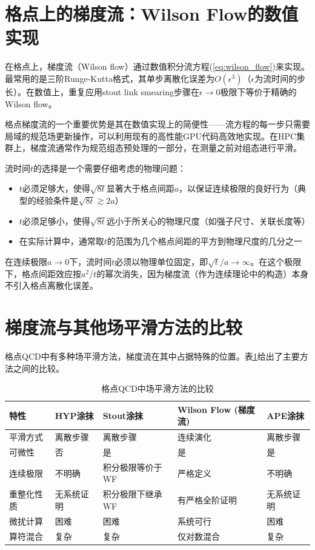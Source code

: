 \documentclass[12pt,a4paper]{ctexart}
\theoremstyle{definition}
\begin{document}
\section{格点上的梯度流：Wilson Flow的数值实现}

在格点上，梯度流（Wilson flow）通过数值积分流方程(\ref{eq:wilson_flow})来实现。最常用的是三阶Runge-Kutta格式，其单步离散化误差为$O(\epsilon^3)$（$\epsilon$为流时间的步长）。在数值上，重复应用stout link smearing步骤在$\epsilon \to 0$极限下等价于精确的Wilson flow\cite{Luscher2010}。

格点梯度流的一个重要优势是其在数值实现上的简便性——流方程的每一步只需要局域的规范场更新操作，可以利用现有的高性能GPU代码高效地实现。在HPC集群上，梯度流通常作为规范组态预处理的一部分，在测量之前对组态进行平滑。

流时间$t$的选择是一个需要仔细考虑的物理问题：
\begin{itemize}
    \item $t$必须足够大，使得$\sqrt{8t}$显著大于格点间距$a$，以保证连续极限的良好行为（典型的经验条件是$\sqrt{8t} \gtrsim 2a$）
    \item $t$必须足够小，使得$\sqrt{8t}$远小于所关心的物理尺度（如强子尺寸、关联长度等）
    \item 在实际计算中，通常取$t$的范围为几个格点间距的平方到物理尺度的几分之一
\end{itemize}

在连续极限$a \to 0$下，流时间$t$必须以物理单位固定，即$\sqrt{t}/a \to \infty$。在这个极限下，格点间距效应按$a^2/t$的幂次消失，因为梯度流（作为连续理论中的构造）本身不引入格点离散化误差。

\section{梯度流与其他场平滑方法的比较}

格点QCD中有多种场平滑方法，梯度流在其中占据特殊的位置。表\ref{tab:comparison}给出了主要方法之间的比较。

\begin{table}[H]
\centering
\caption{格点QCD中场平滑方法的比较}
\label{tab:comparison}
\begin{tabular}{p{2.5cm}p{3cm}p{3cm}p{3cm}p{3cm}}
\toprule
特性 & HYP涂抹 & Stout涂抹 & Wilson Flow (梯度流) & APE涂抹 \\
\midrule
平滑方式 & 离散步骤 & 离散步骤 & 连续演化 & 离散步骤 \\
可微性 & 否 & 是 & 是 & 是 \\
连续极限 & 不明确 & 积分极限等价于WF & 严格定义 & 不明确 \\
重整化性质 & 无系统证明 & 积分极限下继承WF & 有严格全阶证明 & 无系统证明 \\
微扰计算 & 困难 & 困难 & 系统可行 & 困难 \\
算符混合 & 复杂 & 复杂 & 仅对数混合 & 复杂 \\
\bottomrule
\end{tabular}
\end{table}
\end{document}
